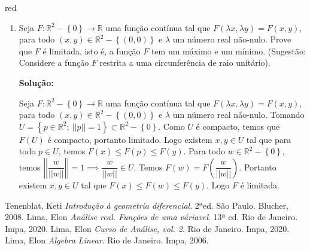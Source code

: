 \documentclass[12pt,leqno,twoside]{amsart}
\theoremstyle{definition}
\begin{document}
\begin{color}{red}
\begin{enumerate}
\begin{enumerate}
		\end{enumerate}
	\item Seja $F: \mathbb{R}^2 - \left\{0\right\}\to \mathbb{R}$ uma função contínua tal que $F\left(\lambda x, \lambda y\right) = F(x,y)$, para todo $(x,y) \in \mathbb{R}^2 -\left\{ (0,0)\right\}$ e $\lambda$ um número real não-nulo. Prove que $F$ é limitada, isto é, a função $F$ tem um máximo e um mínimo. (Sugestão: Considere a função $F$ restrita a uma circunferência de raio unitário).

\textbf{Solução:}

		Seja $F: \mathbb{R}^2 - \left\{0\right\}\to \mathbb{R}$ uma função contínua tal que $F\left(\lambda x, \lambda y\right) = F(x,y)$, para todo $(x,y) \in \mathbb{R}^2 -\left\{ (0,0)\right\}$ e $\lambda$ um número real não-nulo. Tomando $U = \left\{ p \in \mathbb{R}^2 ;\: || p || = 1 \right\} \subset \mathbb{R}^2 - \left\{0 \right\}$. Como $U$ é compacto, temos  que $F(U)$ é compacto, portanto limitado. Logo existem $x,y\in U$ tal que para todo $p\in U$, temos  $F(x) \leq F(p) \leq F(y)$.
		Para todo $w\in \mathbb{R}^2-\left\{0 \right\}$, temos $ \left|\left| \dfrac{w}{||w||} \right|\right|   = 1  \implies \dfrac{w}{||w||} \in U $. Temos $F(w) = F\left(\dfrac{w}{||w||}\right)$. Portanto existem $x,y \in U$ tal que $ F(x) \leq F(w) \leq F(y)$. Logo $F$ é limitada.
\end{enumerate}




\end{color}

	\begin{thebibliography}{999}


		  Tenenblat, Keti \emph{Introdução à geometria diferencial}. 2ªed. São Paulo. Blucher, 2008.
		 Lima, Elon \emph{Análise real. Funções de uma váriavel}. 13ª ed. Rio de Janeiro. Impa, 2020.
   Lima, Elon \emph{Curso de An{\'a}lise, vol. 2}. Rio de Janeiro. Impa, 2020.
   Lima, Elon \emph{Algebra Linear}. Rio de Janeiro. Impa, 2006.


	\end{thebibliography}
\end{document}
